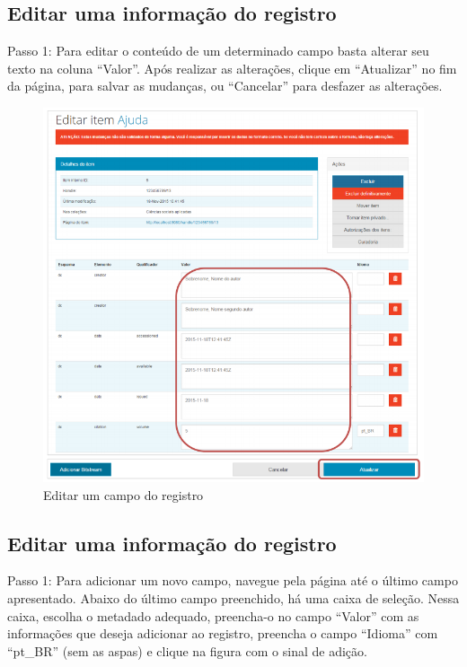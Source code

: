 \documentclass[12pt,hidelinks]{article}
\begin{document}
    \subsection{Editar uma informação do registro}
    
    Passo 1: Para editar o conteúdo de um determinado campo basta alterar seu texto na coluna “Valor”. Após realizar as alterações, clique em “Atualizar” no fim da página, para salvar as mudanças, ou “Cancelar” para desfazer as alterações.
    
    \begin{figure}[!htp]
                \centering
                \includegraphics[scale=0.7]{figura/Figura93.png}
                \caption{Editar um campo do registro}
            \label{Rotulo}
        \end{figure}
    
    \subsection{Editar uma informação do registro}
    
    
    Passo 1: Para adicionar um novo campo, navegue pela página até o último campo apresentado.
    Abaixo do último campo preenchido, há uma caixa de seleção. Nessa caixa, escolha o metadado
    adequado, preencha-o no campo “Valor” com as informações que deseja adicionar ao registro,
    preencha o campo “Idioma” com “pt\_BR” (sem as aspas) e clique na figura com o sinal de adição.
    
\end{document}
